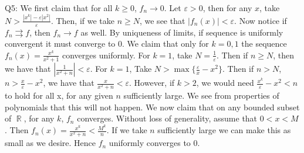 \documentclass[letterpaper]{article}
\DeclareMathOperator{\R}{\mathbb{R}}
\begin{document}
\noindent Q5: We first claim that for all $k\geq 0$, $f_n \to 0$. Let $\varepsilon>0$, then for any $x$, take $N > \frac{|x^k|-\varepsilon|x^2|}{\varepsilon}$. Then, if we take $n\geq N$, we see that $|f_n(x)|<\varepsilon$. Now notice if $f_n \rightrightarrows f$, then $f_n \rightarrow f$ as well. By uniqueness of limits, if sequence is uniformly convergent it must converge to 0. We claim that only for $k=0,1$ the sequence $f_n(x) = \frac{x^k}{x^2+1}$ converges uniformly. 
For $k=1$, take $N=\frac{1}{\varepsilon}$. Then if $n\geq N$, then we have that $|\frac{1}{x^2+n}|<\varepsilon$. For $k=1$, Take $N> \max\{ \frac{\varepsilon}{x} -x^2\}$. Then if $n>N$, $n>\frac{x}{\varepsilon}-x^2$, we have that $\frac{x}{x^2+n}<\varepsilon$. However, if $k>2$, we would need $\frac{x^k}{\varepsilon}-x^2<n$ to hold for all x, for any given $n$ sufficiently large. We see from properties of polynomials that this will not happen. We now claim that on any bounded subset of $\R$, for any $k$, $f_n$ converges. Without loss of generality, assume that $0<x<M$. Then $f_n(x) = \frac{x^k}{x^2+n}<\frac{M^k}{n}$. If we take $n$ sufficiently large we can make this as small as we desire. Hence $f_n$ uniformly converges to 0. 
\end{document}
